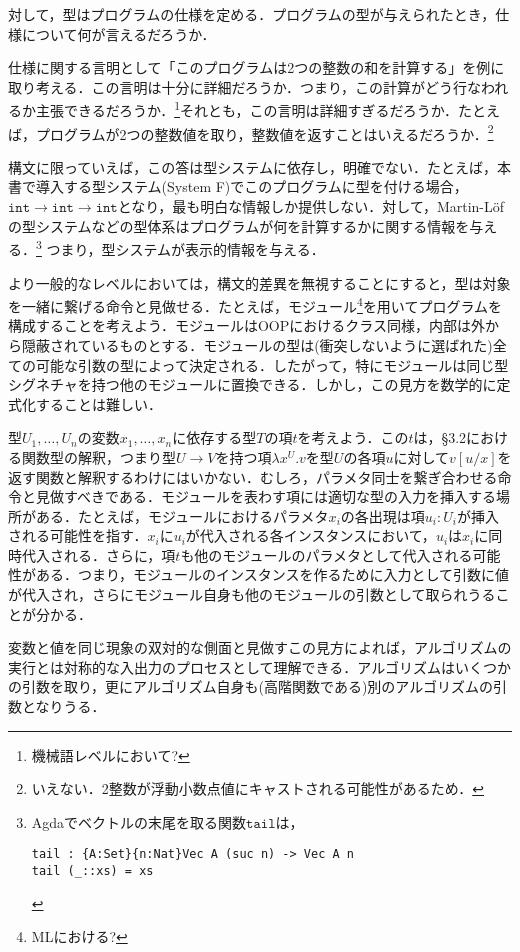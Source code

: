 \documentclass[a4paper,10pt,platex, dvipdfmx]{jsarticle}
\begin{document}
対して，型はプログラムの仕様を定める．プログラムの型が与えられたとき，仕様について何が言えるだろうか．

仕様に関する言明として「このプログラムは2つの整数の和を計算する」を例に取り考える．この言明は十分に詳細だろうか．つまり，この計算がどう行なわれるか主張できるだろうか．\footnote{機械語レベルにおいて?}それとも，この言明は詳細すぎるだろうか．たとえば，プログラムが2つの整数値を取り，整数値を返すことはいえるだろうか．\footnote{いえない．2整数が浮動小数点値にキャストされる可能性があるため．}

構文に限っていえば，この答は型システムに依存し，明確でない．たとえば，本書で導入する型システム(System F)でこのプログラムに型を付ける場合，$\mathtt{int\rightarrow int \rightarrow int}$となり，最も明白な情報しか提供しない．対して，Martin-L\"ofの型システムなどの型体系はプログラムが何を計算するかに関する情報を与える．\footnote{Agdaでベクトルの末尾を取る関数$\mathtt{tail}$は，\begin{lstlisting}
tail : {A:Set}{n:Nat}Vec A (suc n) -> Vec A n
tail (_::xs) = xs
\end{lstlisting}}
つまり，型システムが表示的情報を与える．

より一般的なレベルにおいては，構文的差異を無視することにすると，型は対象を一緒に繋げる命令と見做せる．たとえば，モジュール\footnote{MLにおける?}を用いてプログラムを構成することを考えよう．モジュールはOOPにおけるクラス同様，内部は外から隠蔽されているものとする．モジュールの型は(衝突しないように選ばれた)全ての可能な引数の型によって決定される．したがって，特にモジュールは同じ型シグネチャを持つ他のモジュールに置換できる．しかし，この見方を数学的に定式化することは難しい．

型$U_{1},\ldots,U_{n}$の変数$x_{1},\ldots, x_{n}$に依存する型$T$の項$t$を考えよう．この$t$は，\S3.2における関数型の解釈，つまり型$U\rightarrow V$を持つ項$\lambda x^{U}. v$を型$U$の各項$u$に対して$v\left[u/x\right]$を返す関数と解釈するわけにはいかない．むしろ，パラメタ同士を繋ぎ合わせる命令と見做すべきである．モジュールを表わす項には適切な型の入力を挿入する場所がある．たとえば，モジュールにおけるパラメタ$x_{i}$の各出現は項$u_{i}:U_{i}$が挿入される可能性を指す．$x_{i}$に$u_{i}$が代入される各インスタンスにおいて，$u_{i}$は$x_{i}$に同時代入される．さらに，項$t$も他のモジュールのパラメタとして代入される可能性がある．つまり，モジュールのインスタンスを作るために入力として引数に値が代入され，さらにモジュール自身も他のモジュールの引数として取られうることが分かる．

変数と値を同じ現象の双対的な側面と見做すこの見方によれば，アルゴリズムの実行とは対称的な入出力のプロセスとして理解できる．アルゴリズムはいくつかの引数を取り，更にアルゴリズム自身も(高階関数である)別のアルゴリズムの引数となりうる．
\end{document}
